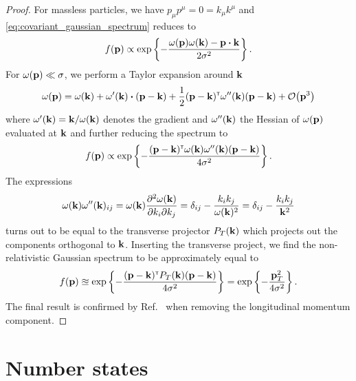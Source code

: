 \nonrelativisticgaussianmom
\begin{proof}
	For massless particles, we have $p_\mu p^\mu=0=k_\mu k^\mu$ and \cref{eq:covariant_gaussian_spectrum} reduces to
	\begin{equation*}
		f(\vb{p})
		\propto
		\exp\left\{
			-
			\frac{\omega(\vb{p})\omega(\vb{k})-\vb{p}\vdot\vb{k}}{2\sigma^2}
		\right\}
		.
	\end{equation*}
	For $\omega(\vb{p})\ll\sigma$, we perform a Taylor expansion around $\vb{k}$
	\begin{equation*}
		\omega(\vb{p})
		=
		\omega(\vb{k})
		+
		\omega^\prime(\vb{k})
		\vdot
		(\vb{p}-\vb{k})
		+
		\frac{1}{2}
		(\vb{p}-\vb{k})^\trans
		\omega^{\prime\prime}(\vb{k})
		(\vb{p}-\vb{k})
		+
		\order{\vb{p}^3}
	\end{equation*}
	where $\omega^\prime(\vb{k})=\vb{k}/\omega(\vb{k})$ denotes the gradient and $\omega^{\prime\prime}(\vb{k})$ the Hessian of $\omega(\vb{p})$ evaluated at $\vb{k}$ and further reducing the spectrum to
	\begin{equation*}
		f(\vb{p})
		\propto
		\exp\left\{
			-
			\frac{
				(\vb{p}-\vb{k})^{\scriptscriptstyle\mathsf{T}}
				\omega(\vb{k})
				\omega^{\prime\prime}(\vb{k})
				(\vb{p}-\vb{k})
			}{4\sigma^2}
		\right\}
		.
	\end{equation*}
	The expressions
	\begin{equation*}
		\omega(\vb{k})
		\omega^{\prime\prime}(\vb{k})_{ij}
		=
		\omega(\vb{k})
		\pdv{\omega(\vb{k})}{k_i}{k_j}
		=
		\delta_{ij}
		-
		\frac{k_ik_j}{\omega(\vb{k})^2}
		=
		\delta_{ij}
		-
		\frac{k_ik_j}{\vb{k}^2}
	\end{equation*}
	turns out to be equal to the transverse projector $P_T(\vb{k})$ which projects out the components orthogonal to $\vb{k}$.
	Inserting the transverse project, we find the non-relativistic Gaussian spectrum to be approximately equal to
	\begin{equation*}
		f(\vb{p})
		\approxeq
		\exp\left\{
			-
			\frac{
				(\vb{p}-\vb{k})^{\scriptscriptstyle\mathsf{T}}
				P_T(\vb{k})
				(\vb{p}-\vb{k})
			}{4\sigma^2}
		\right\}
		=
		\exp\left\{
			-
			\frac{
				\vb{p}_T^2
			}{4\sigma^2}
		\right\}
		.
	\end{equation*}
	The final result is confirmed by Ref.~\cite[eq.~(25)]{Naumov2013} when removing the longitudinal momentum component.
\end{proof}

\section{Number states}

